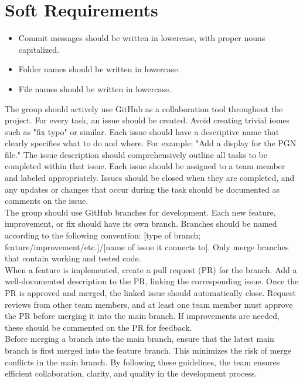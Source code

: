 \chapter{Soft Requirements}

\begin{itemize}
    \item Commit messages should be written in lowercase, with proper nouns capitalized.
    \item Folder names should be written in lowercase.
    \item File names should be written in lowercase.
\end{itemize}

The group should actively use GitHub as a collaboration tool throughout the project. For every task, an issue should be created. Avoid creating trivial issues such as "fix typo" or similar. Each issue should have a descriptive name that clearly specifies what to do and where. For example: "Add a display for the PGN file." The issue description should comprehensively outline all tasks to be completed within that issue. Each issue should be assigned to a team member and labeled appropriately. Issues should be closed when they are completed, and any updates or changes that occur during the task should be documented as comments on the issue. \\

The group should use GitHub branches for development. Each new feature, improvement, or fix should have its own branch. Branches should be named according to the following convention: [type of branch; feature/improvement/etc.]/[name of issue it connects to]. Only merge branches that contain working and tested code. \\

When a feature is implemented, create a pull request (PR) for the branch. Add a well-documented description to the PR, linking the corresponding issue. Once the PR is approved and merged, the linked issue should automatically close. Request reviews from other team members, and at least one team member must approve the PR before merging it into the main branch. If improvements are needed, these should be commented on the PR for feedback. \\

Before merging a branch into the main branch, ensure that the latest main branch is first merged into the feature branch. This minimizes the risk of merge conflicts in the main branch. By following these guidelines, the team ensures efficient collaboration, clarity, and quality in the development process.\\